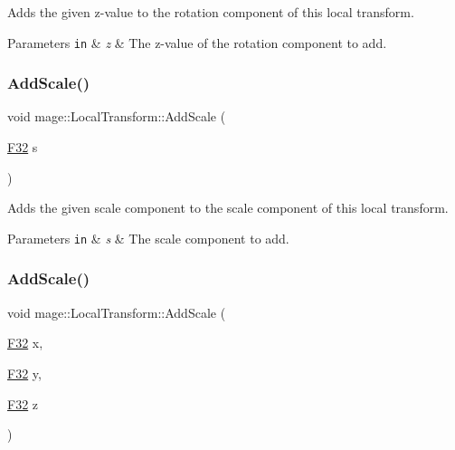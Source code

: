 Adds the given z-\/value to the rotation component of this local transform.


\begin{DoxyParams}[1]{Parameters}
\mbox{\tt in}  & {\em z} & The z-\/value of the rotation component to add. \\
\hline
\end{DoxyParams}
\mbox{\label{classmage_1_1_local_transform_a7c7c84c097157d87bcd3c1d58fc6f8df}} 
\subsubsection{\texorpdfstring{Add\+Scale()}{AddScale()}\hspace{0.1cm}{\footnotesize\ttfamily [1/4]}}
{\footnotesize\ttfamily void mage\+::\+Local\+Transform\+::\+Add\+Scale (\begin{DoxyParamCaption}\item[{\mbox{\hyperlink{namespacemage_aa97e833b45f06d60a0a9c4fc22ae02c0}{F32}}}]{s }\end{DoxyParamCaption})\hspace{0.3cm}{\ttfamily [noexcept]}}

Adds the given scale component to the scale component of this local transform.


\begin{DoxyParams}[1]{Parameters}
\mbox{\tt in}  & {\em s} & The scale component to add. \\
\hline
\end{DoxyParams}
\mbox{\label{classmage_1_1_local_transform_a8de03038d4455846983ccf5b7a0cb08d}} 
\subsubsection{\texorpdfstring{Add\+Scale()}{AddScale()}\hspace{0.1cm}{\footnotesize\ttfamily [2/4]}}
{\footnotesize\ttfamily void mage\+::\+Local\+Transform\+::\+Add\+Scale (\begin{DoxyParamCaption}\item[{\mbox{\hyperlink{namespacemage_aa97e833b45f06d60a0a9c4fc22ae02c0}{F32}}}]{x,  }\item[{\mbox{\hyperlink{namespacemage_aa97e833b45f06d60a0a9c4fc22ae02c0}{F32}}}]{y,  }\item[{\mbox{\hyperlink{namespacemage_aa97e833b45f06d60a0a9c4fc22ae02c0}{F32}}}]{z }\end{DoxyParamCaption})\hspace{0.3cm}{\ttfamily [noexcept]}}

